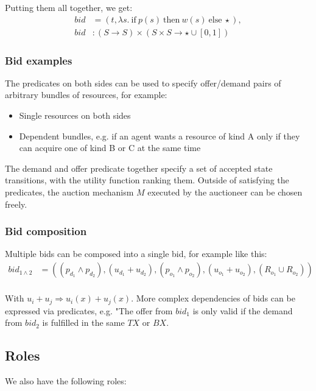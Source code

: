 Putting them all together, we get:
\begin{equation}
    \begin{aligned}  
    bid &= (t, \lambda s.\ \text{if}\ p(s)\ \text{then}\ w(s)\ \text{else}\ \star),\\
    bid &: (S \rightarrow S) \times (S \times S \rightarrow \star \cup [0, 1])
    \end{aligned}
\end{equation}

\subsubsection{Bid examples}

The predicates on both sides can be used to specify offer/demand pairs of arbitrary bundles of resources, for example:

\begin{itemize}
    \item Single resources on both sides
    \item Dependent bundles, e.g. if an agent wants a resource of kind A only if they can acquire one of kind B or C at the same time
\end{itemize}

The demand and offer predicate together specify a set of accepted state transitions, with the utility function ranking them. Outside of satisfying the predicates, the auction mechanism $M$ executed by the auctioneer can be chosen freely. 

\subsubsection{Bid composition} Multiple bids can be composed into a single bid, for example like this:
\begin{equation} 
    \begin{aligned}
    bid_{1\land2} &= ((p_{d_1} \land p_{d_2}), (u_{d_1} + u_{d_2}), (p_{o_1} \land p_{o_2}), (u_{o_1} + u_{o_2}), (R_{o_1} \cup R_{o_2})) \\
    \end{aligned}
\end{equation}

With $u_i + u_j \Rightarrow u_i(x) + u_j(x)$. 
More complex dependencies of bids can be expressed via predicates, e.g. "The offer from $bid_1$ is only valid if the demand from $bid_2$ is fulfilled in the same $TX$ or $BX$.

\subsection{Roles}
We also have the following roles:

